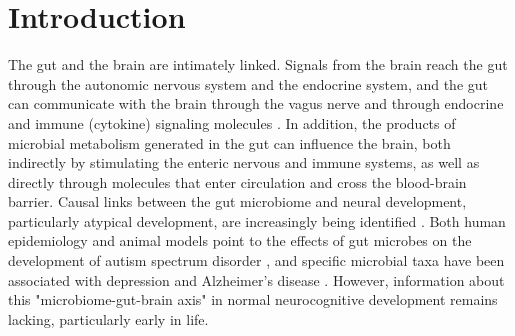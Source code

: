 \documentclass{article}
\begin{document}



\section*{Introduction}

The gut and the brain are intimately linked. Signals from the brain
reach the gut through the autonomic nervous system and the endocrine
system, and the gut can communicate with the brain through the vagus
nerve and through endocrine and immune (cytokine) signaling molecules
\cite{cerdoEarlyNutritionGut2019,pronovostPerinatalInteractionsMicrobiome2019,sharonCentralNervousSystem2016,togniniGutMicrobiotaPotential2017}.
In addition, the products of microbial metabolism generated in the gut can
influence the brain, both indirectly by stimulating the enteric nervous
and immune systems, as well as directly through molecules that enter
circulation and cross the blood-brain barrier. Causal links between the
gut microbiome and neural development, particularly atypical
development, are increasingly being identified
\cite{spichakMiningMicrobesMental2021}.
Both human epidemiology and animal models point to the effects
of gut microbes on the development of autism spectrum disorder
\cite{laueProspectiveAssociationsInfant2020,wanUnderdevelopmentGutMicrobiota2021},
and specific microbial taxa have been associated with depression
\cite{mayneris-perxachsMicrobiotaAlterationsProline2022,valles-colomerNeuroactivePotentialHuman2019}
and Alzheimer's disease
\cite{fungInteractionsMicrobiotaImmune2017,kimProbioticSupplementationImproves2021}.
However, information about this "microbiome-gut-brain
axis" in normal neurocognitive development remains lacking,
particularly early in life.
\end{document}
